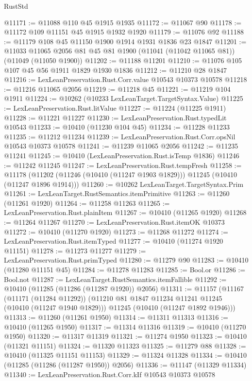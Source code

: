 \begin{lexlean}{RustStd}
\begin{coremodule}
@11171 := @11088 @110 @45 @1915 @1935
@11172 := @11067 @90
@11178 := @11172 @109 @11151 @45 @1915 @1932 @1920
@11179 := @11076 @92
@11188 := @11179 @108 @45 @11150 @1900 @1914 @1931 @1836 @23 @1847
@11201 := @11033 @11065 @2056 @81 @45 @81 @1900 (@11041 (@11042 @11065 @81)) (@11049 (@11050 @1900))
@11202 := @11188 @11201
@11210 := @11076 @105 @107 @45 @56 @1911 @1829 @1930 @1836
@11212 := @11210 @28 @1847
@11216 := LexLeanPreservation.Rust.Corr.value @10543 @10373 @10578
@11218 := @11216 @11065 @2056
@11219 := @11218 @45
@11221 := @11219 @104 @1911
@11224 := @10262 (@10233 LexLeanTarget.TargetSyntax.Value)
@11225 := LexLeanPreservation.Rust.litValue
@11227 := @11224 (@11225 @1911)
@11228 := @11221 @11227
@11230 := LexLeanPreservation.Rust.typedLit @10543
@11233 := @10410 (@11230 @104 @45)
@11234 := @11228 @11233
@11235 := @11212 @11234
@11239 := LexLeanPreservation.Rust.Corr.opsNil @10543 @10373 @10578
@11241 := @11239 @11065 @2056
@11242 := @11235 @11241
@11245 := @10410 (LexLeanPreservation.Rust.isTemp @1836)
@11246 := @11242 @11245
@11247 := LexLeanPreservation.Rust.tempFresh
@11258 := @11178
    (@11202 (@11246 (@10410 (@11247 @1903 @1829))) @11245 (@10410 (@11247 @1896 @1914)))
@11260 := @10262 LexLeanTarget.TargetSyntax.Prim
@11261 := LexLeanTarget.RustSemantics.itemPrimitive
@11263 := @11260 (@11261 @1920)
@11264 := @11258 @11263
@11265 := LexLeanPreservation.Rust.plainItem
@11267 := @10410 (@11265 @1920)
@11268 := @11264 @11267
@11270 := LexLeanPreservation.Rust.itemOK @10373
@11272 := @10410 (@11270 @1920)
@11273 := @11268 @11272
@11274 := LexLeanPreservation.Rust.itemTyped
@11277 := @10410 (@11274 @1920 @11151)
@11278 := @11273 @11277
@11279 := LexLeanPreservation.Rust.primTyped
@11280 := @11279 @90
@11283 := @10410 (@11280 @11151 @45)
@11284 := @11278 @11283
@11285 := Bool.or
@11286 := Bool.not
@11287 := LexLeanTarget.RustSemantics.itemFallible
@11292 := @10410 (@11285 (@11286 (@11287 @1920)) @2056)
@11311 := @11157
    (@11167
      (@11171 (@11284 @11292))
      (@11210 @81 @1847 @11234 @11241 @11245 (@10410 (@11247 @1940 @1829)))
      @11245
      (@10410 (@11247 @1892 @1946)))
@11313 := @11260 (@11261 @1950)
@11314 := @11311 @11313
@11316 := @10410 (@11265 @1950)
@11317 := @11314 @11316
@11319 := @10410 (@11270 @1950)
@11320 := @11317 @11319
@11321 := @11274 @1950
@11323 := @10410 (@11321 @11151)
@11324 := @11320 @11323
@11325 := @11279 @88
@11328 := @10410 (@11325 @11151 @11153)
@11329 := @11324 @11328
@11334 := @10410 (@11285 (@11286 (@11287 @1950)) @2056)
@11336 := @11147 (@11329 @11334)
@11340 := LexLeanPreservation.Rust.Corr.kIf @10543 @10373 @10578

\end{coremodule}
\end{lexlean}
